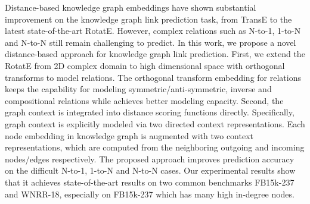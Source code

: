Distance-based knowledge graph embeddings have shown substantial improvement on the knowledge graph link prediction task, from TransE to the latest state-of-the-art RotatE. However, complex relations such as N-to-1, 1-to-N and N-to-N still remain challenging to predict. In this work, we propose a novel distance-based approach for knowledge graph link prediction. First, we extend the RotatE from 2D complex domain to high dimensional space with orthogonal transforms to model relations. The orthogonal transform embedding for relations keeps the capability for modeling symmetric/anti-symmetric, inverse and compositional relations while achieves better modeling capacity. Second, the graph context is integrated into distance scoring functions directly. Specifically, graph context is explicitly modeled via two directed context representations. Each node embedding in knowledge graph is augmented with two context representations, which are computed from the neighboring outgoing and incoming nodes/edges respectively. The proposed approach improves prediction accuracy on the difficult N-to-1, 1-to-N and N-to-N cases. Our experimental results show that it achieves state-of-the-art results on two common benchmarks FB15k-237 and WNRR-18, especially on FB15k-237 which has many high in-degree nodes.
